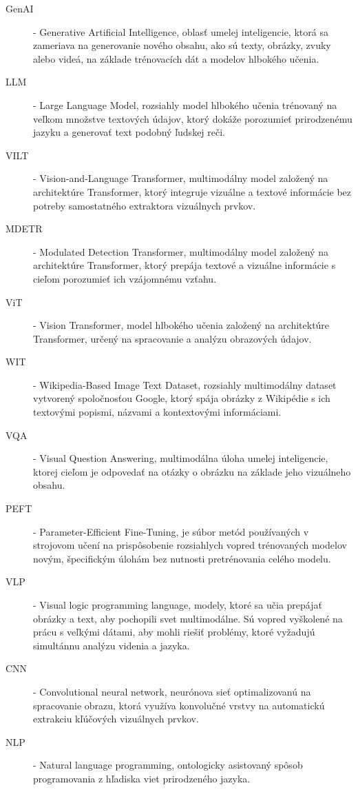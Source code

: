 \documentclass[]{tukediphc}
\begin{document}
\begin{description}
\item[GenAI] - Generative Artificial Intelligence, oblasť umelej inteligencie, ktorá sa zameriava na generovanie nového obsahu, ako sú texty, obrázky, zvuky alebo videá, na základe trénovacích dát a modelov hlbokého učenia.
\item[LLM] - Large Language Model, rozsiahly model hlbokého učenia trénovaný na veľkom množstve textových údajov, ktorý dokáže porozumieť prirodzenému jazyku a generovať text podobný ľudskej reči.
\item[VILT] - Vision-and-Language Transformer, multimodálny model založený na architektúre Transformer, ktorý integruje vizuálne a textové informácie bez potreby samostatného extraktora vizuálnych prvkov.
\item[MDETR] - Modulated Detection Transformer, multimodálny model založený na architektúre Transformer, ktorý prepája textové a vizuálne informácie s cieľom porozumieť ich vzájomnému vzťahu.
\item[ViT] - Vision Transformer, model hlbokého učenia založený na architektúre Transformer, určený na spracovanie a analýzu obrazových údajov.
\item[WIT] - Wikipedia-Based Image Text Dataset, rozsiahly multimodálny dataset vytvorený spoločnosťou Google, ktorý spája obrázky z Wikipédie s ich textovými popismi, názvami a kontextovými informáciami.
\item[VQA] - Visual Question Answering, multimodálna úloha umelej inteligencie, ktorej cieľom je odpovedať na otázky o obrázku na základe jeho vizuálneho obsahu. 
\item[PEFT] - Parameter-Efficient Fine-Tuning, je súbor metód používaných v strojovom učení na prispôsobenie rozsiahlych vopred trénovaných modelov novým, špecifickým úlohám bez nutnosti pretrénovania celého modelu.
\item[VLP] - Visual logic programming language, modely, ktoré sa učia prepájať obrázky a text, aby pochopili svet multimodálne. Sú vopred vyškolené na prácu s veľkými dátami, aby mohli riešiť problémy, ktoré vyžadujú simultánnu analýzu videnia a jazyka.
\item[CNN] - Convolutional neural network, neurónova sieť optimalizovanú na spracovanie obrazu, ktorá využíva konvolučné vrstvy na automatickú extrakciu kľúčových vizuálnych prvkov.
\item[NLP] - Natural language programming, ontologicky asistovaný spôsob programovania z hľadiska viet prirodzeného jazyka.
\end{description}
\end{document}
